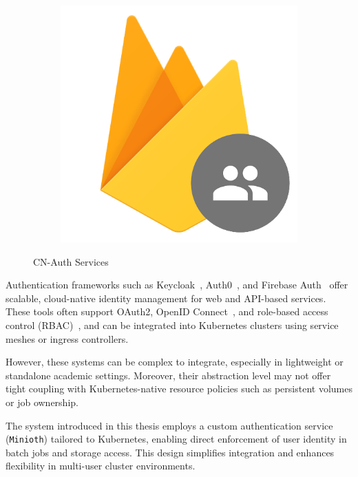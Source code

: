 \begin{figure}[h!]
\begin{subfigure}[b]{0.3\textwidth}
    \includegraphics[width=\textwidth]{Images/firebase-auth.png}
    \label{fig:firebase}
  \end{subfigure}
  \caption{CN-Auth Services}
  \label{fig:authservices}
\end{figure}


Authentication frameworks such as Keycloak~\cite{keycloak}, Auth0~\cite{auth0}, and Firebase Auth~\cite{firebase-auth} offer scalable, cloud-native identity management 
for web and API-based services. These tools often support OAuth2, OpenID Connect~\cite{openid-connect}, and role-based access control (RBAC)~\cite{sandhu-rbac}, and can be 
integrated into Kubernetes clusters using service meshes or ingress controllers.

However, these systems can be complex to integrate, especially in lightweight or standalone academic settings. Moreover, their 
abstraction level may not offer tight coupling with Kubernetes-native resource policies such as persistent volumes or job ownership.

The system introduced in this thesis employs a custom authentication service (\texttt{Minioth}) tailored to Kubernetes, enabling 
direct enforcement of user identity in batch jobs and storage access. This design simplifies integration and enhances flexibility 
in multi-user cluster environments.

